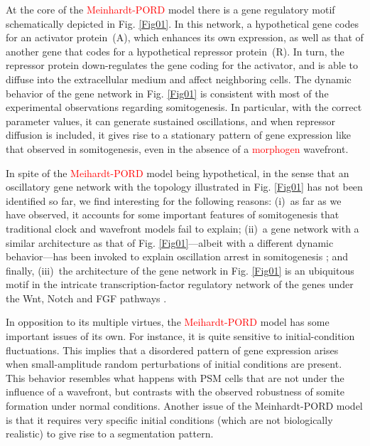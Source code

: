 \documentclass[%
 preprint,
 aip, 
 amsmath,amssymb,
]{revtex4-2}
\begin{document}
At the core of the \textcolor{red}{Meinhardt-PORD} model there is a gene regulatory motif schematically depicted in Fig. \ref{Fig01}. In this network, a hypothetical gene codes for an activator protein~(A), which enhances its own expression, as well as that of another gene that codes for a hypothetical repressor protein~(R). In turn, the repressor protein down-regulates the gene coding for the activator, and is able to diffuse into the extracellular medium and affect neighboring cells. The dynamic behavior of the gene network in Fig. \ref{Fig01} is consistent with most of the experimental observations regarding somitogenesis. In particular, with the correct parameter values, it can generate sustained oscillations, and when repressor diffusion is included, it gives rise to a stationary pattern of gene expression like that observed in somitogenesis, even in the absence of a \textcolor{red}{morphogen} wavefront.
	
In spite of the \textcolor{red}{Meihardt-PORD} model being hypothetical, in the sense that an oscillatory gene network with the topology illustrated in Fig. \ref{Fig01} has not been identified so far, we find interesting for the following reasons: (i)~as far as we have observed, it accounts for some important features of somitogenesis that traditional clock and wavefront models fail to explain; (ii)~a gene network with a similar architecture as that of Fig. \ref{Fig01}---albeit with a different dynamic behavior---has been invoked to explain oscillation arrest in somitogenesis \cite{Santillan2008, Zavala2012}; and finally, (iii)~the architecture of the gene network in Fig. \ref{Fig01} is an ubiquitous motif in the intricate transcription-factor regulatory network of the genes under the Wnt, Notch and FGF pathways \cite{Gibb2010, Zavala2012}.
	
In opposition to its multiple virtues, the \textcolor{red}{Meihardt-PORD} model  has some important issues of its own. For instance, it is quite sensitive to initial-condition fluctuations. This implies that a disordered pattern of gene expression arises when small-amplitude random perturbations of initial conditions are present. This behavior resembles what happens with PSM cells that are not under the influence of a wavefront, but contrasts with the observed robustness of somite formation under normal conditions. Another issue of the Meinhardt-PORD model is that it requires very specific initial conditions (which are not biologically realistic) to give rise to a segmentation pattern. 
\end{document}
